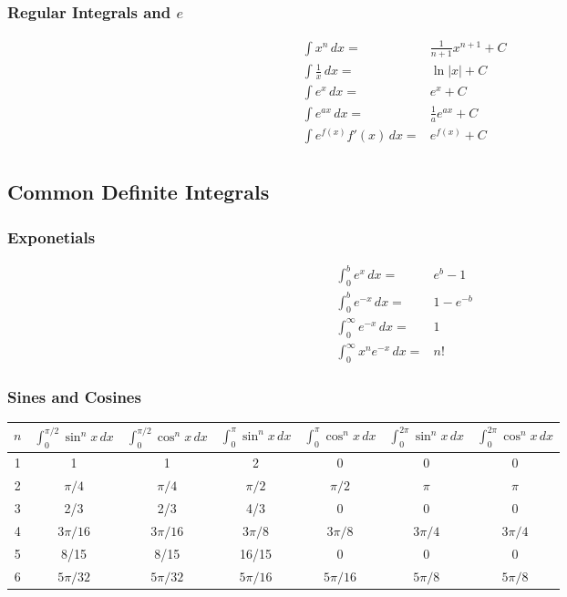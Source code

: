 \documentclass[10pt]{article}
\begin{document}
\begin{multicols}{2}
   \subsubsection*{Regular Integrals and \(e\)}

\begin{align*}
   & \int x^{n} \, dx = & \frac{1}{n+1}x^{n+1} + C \\
   & \int \frac{1}{x} \, dx = & \ln|x| + C \\
   & \int e^{x} \, dx = & e^{x} + C \\
   & \int e^{ax} \, dx = & \frac{1}{a}e^{ax} + C \\
   & \int e^{f(x)}f'(x) \, dx = & e^{f(x)} + C \\
\end{align*}

   \subsection*{Common Definite Integrals}

   \subsubsection*{Exponetials}

\begin{align*}
   & \int_{0}^{{b}} e^{x} \, dx = & e^{b} - 1 \\
   & \int_{0}^{{b}} e^{-x} \, dx = & 1 - e^{-b} \\
   & \int_{0}^{{\infty}} e^{-x} \, dx = & 1 \\
   & \int_{0}^{{\infty}} x^{n}e^{-x} \, dx = & n! 
\end{align*}
\end{multicols}

\subsubsection*{Sines and Cosines}

\begin{table}[htbp]
    \centering
    \begin{tabular}{c||cccccc}
        \hline
        \(n\) & \(\int_{0}^{\pi/2} \sin^{n} x\, dx\) & \(\int_{0}^{\pi/2} \cos^{n} x\, dx\) & \(\int_{0}^{\pi} \sin^{n} x\, dx\) & \(\int_{0}^{\pi} \cos^{n} x\, dx\) & \(\int_{0}^{2\pi} \sin^{n}x \, dx\) & \(\int_{0}^{2\pi} \cos^{n}x \, dx\) \\ \hline
         1  & 1 & 1 & 2 & 0 & 0 & 0 \\
         2  & \(\pi/4\) & \(\pi/4\) & \(\pi/2\) & \(\pi/2\) & \(\pi\) & \(\pi\) \\
         3  & 2/3 & 2/3 & 4/3 & 0 & 0 & 0 \\
         4  & \(3\pi/16\) & \(3\pi/16\) & \(3\pi/8\) & \(3\pi/8\) & \(3\pi/4\) & \(3\pi/4\) \\
         5  & 8/15 & 8/15 & 16/15 & 0 & 0 & 0 \\
         6  & \(5\pi/32\) & \(5\pi/32\) & \(5\pi/16\) & \(5\pi/16\) & \(5\pi/8\) & \(5\pi/8\) \\
        \hline
    \end{tabular}
\end{table}
\end{document}
